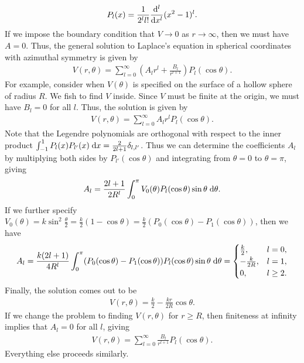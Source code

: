 \begin{align}
    P_{l}(x) = \frac{1}{2^{l} l!} \frac{\mathrm{d}^{l}}{\mathrm{d}x^{l}} (x^{2} - 1)^{l}.
\end{align}
If we impose the boundary condition that $V \to 0$ as $r \to \infty$, then we must have $A = 0$. Thus, the general solution to Laplace's equation in spherical coordinates with azimuthal symmetry is given by
\begin{align}
    V(r,\theta) = \sum_{l=0}^{\infty} \left( A_{l} r^{l} + \frac{B_{l}}{r^{l+1}} \right) P_{l}(\cos \theta).
\end{align}
For example, consider when $V(\theta)$ is specified on the surface of a hollow sphere of radius $R$. We fish to find $V$ inside. Since $V$ must be finite at the origin, we must have $B_{l} = 0$ for all $l$. Thus, the solution is given by
\begin{align}
    V(r,\theta) = \sum_{l=0}^{\infty} A_{l} r^{l} P_{l}(\cos \theta).
\end{align}
Note that the Legendre polynomials are orthogonal with respect to the inner product $\int_{-1}^{1} P_{l}(x) P_{l'}(x) \; \mathrm{d}x = \frac{2}{2l+1} \delta_{l,l'}$. Thus we can determine the coefficients $A_{l}$ by multiplying both sides by $P_{l'}(\cos \theta)$ and integrating from $\theta = 0$ to $\theta = \pi$, giving
\begin{align}
    A_{l} = \frac{2l+1}{2 R^{l}} \int_{0}^{\pi} V_{0}(\theta) P_{l}(\cos \theta) \sin \theta \; \mathrm{d}\theta.
\end{align}
If we further specify $V_{0}(\theta) = k \sin^{2} \frac{\theta}{2} = \frac{k}{2} (1 - \cos \theta) = \frac{k}{2} (P_{0}(\cos \theta) - P_{1}(\cos \theta))$, then we have 
\begin{align}
    A_{l} = \frac{k(2l+1)}{4 R^{l}} \int_{0}^{\pi} (P_{0}(\cos \theta) - P_{1}(\cos \theta)) P_{l}(\cos \theta) \sin \theta \; \mathrm{d}\theta = \begin{cases}
        \frac{k}{2}, & l = 0, \\
        -\frac{k}{2R}, & l = 1, \\
        0, & l \geq 2.
    \end{cases}
\end{align}
Finally, the solution comes out to be
\begin{align}
    V(r,\theta) = \frac{k}{2} - \frac{k r}{2 R} \cos \theta.
\end{align}
If we change the problem to finding $V(r,\theta)$ for $r \geq R$, then finiteness at infinity implies that $A_{l} = 0$ for all $l$, giving
\begin{align}
    V(r,\theta) = \sum_{l=0}^{\infty} \frac{B_{l}}{r^{l+1}} P_{l}(\cos \theta).
\end{align}
Everything else proceeds similarly.

